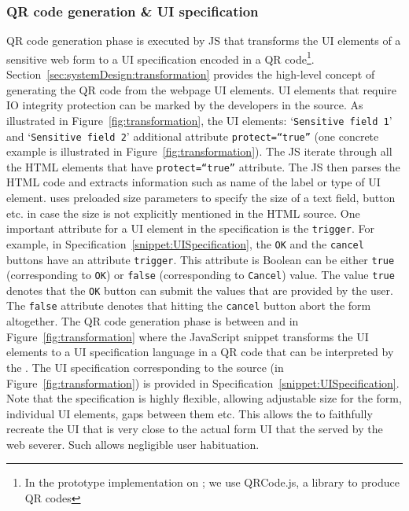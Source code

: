 \subsubsection{\bfseries QR code generation \& UI specification}
\label{sec:prototype:impl:qr}

QR code generation phase is executed by \name JS that transforms the UI elements of a sensitive web form to a UI specification encoded in a QR code\footnote{In the prototype implementation on \name; we use QRCode.js, a \js library to produce QR codes}. Section~\ref{sec:systemDesign:transformation} provides the high-level concept of generating the QR code from the webpage UI elements. UI elements that require IO integrity protection can be marked by the developers in the \html source. As illustrated in Figure~\ref{fig:transformation}, the \html UI elements: `\texttt{Sensitive field 1}' and `\texttt{Sensitive field 2}' additional attribute \texttt{protect=``true''} (one concrete example is illustrated in Figure~\ref{fig:transformation}). The \name JS iterate through all the HTML elements that have \texttt{protect=``true''} attribute. The JS then parses the HTML code and extracts information such as name of the label or type of UI element. \device uses preloaded size parameters to specify the size of a text field, button etc. in case the size is not explicitly mentioned in the HTML source. One important attribute for a UI element in the specification is the \texttt{trigger}. For example, in Specification~\ref{snippet:UISpecification}, the \texttt{OK} and the \texttt{cancel} buttons have an attribute \texttt{trigger}. This attribute is Boolean can be either \texttt{true} (corresponding to \texttt{OK}) or \texttt{false} (corresponding to \texttt{Cancel}) value. The value \texttt{true} denotes that the \texttt{OK} button can submit the values that are provided by the user. The \texttt{false} attribute denotes that hitting the \texttt{cancel} button abort the form altogether. The QR code generation phase is between \one and \two in Figure~\ref{fig:transformation} where the \name JavaScript snippet transforms the UI elements to a UI specification language in a QR code that can be interpreted by the \device. The UI specification corresponding to the \html source (in Figure~\ref{fig:transformation}) is provided in Specification~\ref{snippet:UISpecification}. Note that the specification is highly flexible, allowing adjustable size for the form, individual UI elements, gaps between them etc. This allows the \device to faithfully recreate the UI that is very close to the actual form UI that the served by the web severer. Such allows negligible user habituation. 

